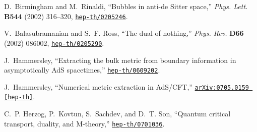 \documentclass[12pt]{article}
\begin{document}
\begin{thebibliography}{10}
D.~Birmingham and M.~Rinaldi, ``Bubbles in anti-de Sitter space,'' {\em Phys.
  Lett.} {\bf B544} (2002)  316--320,
\href{http://arxiv.org/abs/hep-th/0205246}{{\tt hep-th/0205246}}.

V.~Balasubramanian and S.~F. Ross, ``The dual of nothing,'' {\em Phys. Rev.}
  {\bf D66} (2002)  086002,
\href{http://arxiv.org/abs/hep-th/0205290}{{\tt hep-th/0205290}}.

J.~Hammersley, ``Extracting the bulk metric from boundary information in
  asymptotically AdS spacetimes,''
  \href{http://arxiv.org/abs/hep-th/0609202}{{\tt hep-th/0609202}}.

J.~Hammersley, ``Numerical metric extraction in AdS/CFT,''
\href{http://arxiv.org/abs/arXiv:0705.0159 [hep-th]}{{\tt arXiv:0705.0159
  [hep-th]}}.

C.~P. Herzog, P.~Kovtun, S.~Sachdev, and D.~T. Son, ``Quantum critical
  transport, duality, and M-theory,''
\href{http://arxiv.org/abs/hep-th/0701036}{{\tt hep-th/0701036}}.

\end{thebibliography}\endgroup

\end{document}
